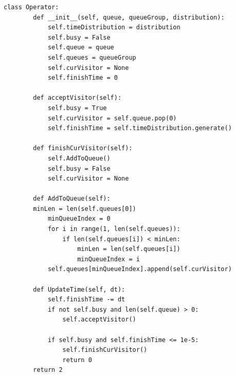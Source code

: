 \documentclass[14pt, a4paper]{extarticle}
\begin{document}
	\begin{lstlisting}[caption=Operator.py]
	class Operator:
		def __init__(self, queue, queueGroup, distribution):
			self.timeDistribution = distribution
			self.busy = False
			self.queue = queue
			self.queues = queueGroup
			self.curVisitor = None
			self.finishTime = 0
		
		def acceptVisitor(self):
			self.busy = True
			self.curVisitor = self.queue.pop(0)
			self.finishTime = self.timeDistribution.generate()
		
		def finishCurVisitor(self):
			self.AddToQueue()
			self.busy = False
			self.curVisitor = None
		
		def AddToQueue(self):
		minLen = len(self.queues[0])
			minQueueIndex = 0
			for i in range(1, len(self.queues)):
				if len(self.queues[i]) < minLen:
					minLen = len(self.queues[i])
					minQueueIndex = i
			self.queues[minQueueIndex].append(self.curVisitor)
		
		def UpdateTime(self, dt):
			self.finishTime -= dt
			if not self.busy and len(self.queue) > 0:
				self.acceptVisitor()
		
			if self.busy and self.finishTime <= 1e-5:
				self.finishCurVisitor()
				return 0
		return 2	
	\end{lstlisting}
\end{document}
